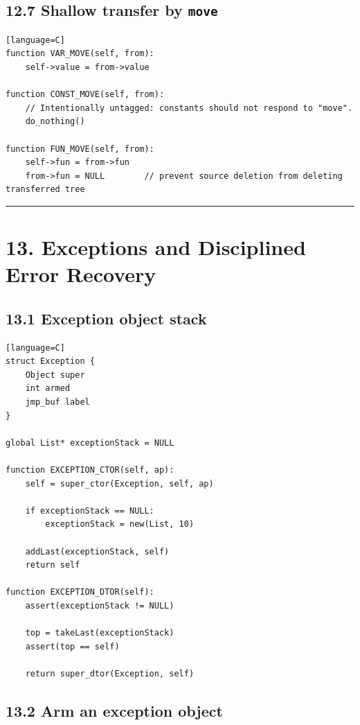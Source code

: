\documentclass[11pt]{article}
\begin{document}
\subsection{\texorpdfstring{12.7 Shallow transfer by
\texttt{move}}{12.7 Shallow transfer by move}}\label{shallow-transfer-by-move}

\begin{verbatim}[language=C]
function VAR_MOVE(self, from):
    self->value = from->value

function CONST_MOVE(self, from):
    // Intentionally untagged: constants should not respond to "move".
    do_nothing()

function FUN_MOVE(self, from):
    self->fun = from->fun
    from->fun = NULL        // prevent source deletion from deleting transferred tree
\end{verbatim}

\begin{center}\rule{0.5\linewidth}{0.5pt}\end{center}

\section{13. Exceptions and Disciplined Error
Recovery}\label{exceptions-and-disciplined-error-recovery}

\subsection{13.1 Exception object stack}\label{exception-object-stack}

\begin{verbatim}[language=C]
struct Exception {
    Object super
    int armed
    jmp_buf label
}

global List* exceptionStack = NULL

function EXCEPTION_CTOR(self, ap):
    self = super_ctor(Exception, self, ap)

    if exceptionStack == NULL:
        exceptionStack = new(List, 10)

    addLast(exceptionStack, self)
    return self

function EXCEPTION_DTOR(self):
    assert(exceptionStack != NULL)

    top = takeLast(exceptionStack)
    assert(top == self)

    return super_dtor(Exception, self)
\end{verbatim}

\subsection{13.2 Arm an exception object}\label{arm-an-exception-object}
\end{document}
